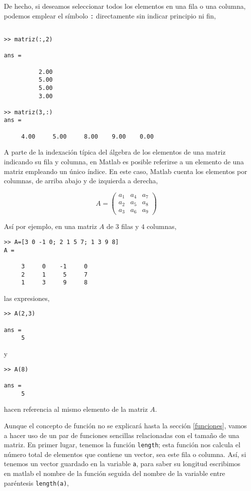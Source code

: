 De hecho, si deseamos seleccionar todos los elementos en una fila o una columna, podemos emplear el símbolo \texttt{:} directamente sin indicar principio ni fin,

\begin{verbatim}

>> matriz(:,2)

ans =

          2.00
          5.00
          5.00
          3.00

>> matriz(3,:)
ans =

     4.00     5.00     8.00    9.00    0.00
\end{verbatim}
 
\label{index}A parte de la indexación típica del álgebra de los elementos de una matriz indicando su fila y columna, en Matlab es posible referirse a un  elemento de una matriz empleando un único índice. En este caso, Matlab cuenta los elementos por columnas, de arriba abajo y de izquierda a derecha, 

\begin{equation*}
A=
\begin{pmatrix}
a_1&a_4&a_7\\
a_2&a_5&a_8\\
a_3&a_6&a_9
\end{pmatrix}
\end{equation*}

Así por ejemplo, en una matriz $A$ de $3$ filas y $4$ columnas, 
\begin{verbatim}
>> A=[3 0 -1 0; 2 1 5 7; 1 3 9 8]
A =

     3     0    -1     0
     2     1     5     7
     1     3     9     8
\end{verbatim}
las expresiones,
\begin{verbatim}
>> A(2,3)

ans =
     5
\end{verbatim}
y
\begin{verbatim}
>> A(8)

ans =
     5
\end{verbatim} 
hacen referencia al mismo elemento de la matriz $A$. 

Aunque el concepto de función no se explicará hasta la sección \ref{funciones}, vamos a hacer uso de un par de funciones sencillas relacionadas con el tamaño de una matriz. En primer lugar, tenemos la función \texttt{length}; esta función nos calcula el número total de elementos que contiene un vector, sea este fila o columna.  Así, si tenemos un vector guardado en la variable  \texttt{a}, para saber su longitud escribimos en matlab el nombre de la función seguida del nombre de la variable entre paréntesis \texttt{length(a)},

